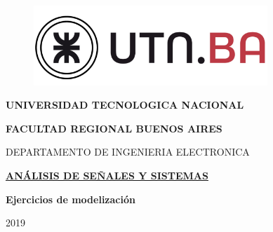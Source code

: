 \documentclass[a4paper,12pt]{article}
\begin{document}
\begin{titlepage}
\pagestyle{fancy}

\begin{center}
\begin{figure}[H]
\begin{center}
\includegraphics[width=250pt]{imagenes/logoUTN.png}
\end{center}
\end{figure}

\vspace*{0.3in}

\begin{LARGE}
\textbf{UNIVERSIDAD TECNOLOGICA NACIONAL}
\end{LARGE}

\vspace*{0.30in}

\begin{Large}
\textbf{FACULTAD REGIONAL BUENOS AIRES}
\end{Large}

\vspace*{0.15in}

\begin{large}
DEPARTAMENTO DE INGENIERIA ELECTRONICA
\end{large}

\vspace*{1in}

\begin{LARGE}
\underline{\textbf{ANÁLISIS DE SEÑALES Y SISTEMAS}}
\end{LARGE}

\vspace*{1in}

\begin{Large}
\textbf{Ejercicios de modelización}\\
\end{Large}
2019
\end{center}

\end{titlepage}

\pagestyle{fancy}
\renewcommand{\footrulewidth}{0.4pt} %
\end{document}
